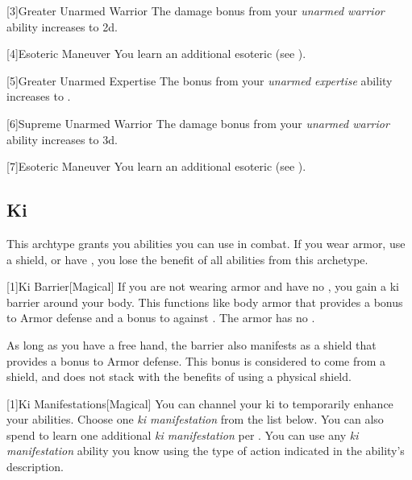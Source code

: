 


        [3]{Greater Unarmed Warrior} The damage bonus from your \textit{unarmed warrior} ability increases to \plus2d.

        [4]{Esoteric Maneuver} You learn an additional esoteric  (see ).

        [5]{Greater Unarmed Expertise} The bonus from your \textit{unarmed expertise} ability increases to .

        [6]{Supreme Unarmed Warrior} The damage bonus from your \textit{unarmed warrior} ability increases to \plus3d.

        [7]{Esoteric Maneuver} You learn an additional esoteric  (see ).

    \subsection{Ki}
        This archtype grants you abilities you can use in combat.
        If you wear armor, use a shield, or have , you lose the benefit of all abilities from this archetype.

        [1]{Ki Barrier}[Magical]
        If you are not wearing armor and have no , you gain a ki barrier around your body.
        This functions like body armor that provides a  bonus to Armor defense and a  bonus to  against .
        The armor has no .

        As long as you have a free hand, the barrier also manifests as a shield that provides a  bonus to Armor defense.
        This bonus is considered to come from a shield, and does not stack with the benefits of using a physical shield.

        [1]{Ki Manifestations}[Magical]
        You can channel your ki to temporarily enhance your abilities.
        Choose one \textit{ki manifestation} from the list below.
        You can also spend  to learn one additional \textit{ki manifestation} per .
        You can use any \textit{ki manifestation} ability you know using the type of action indicated in the ability's description.

